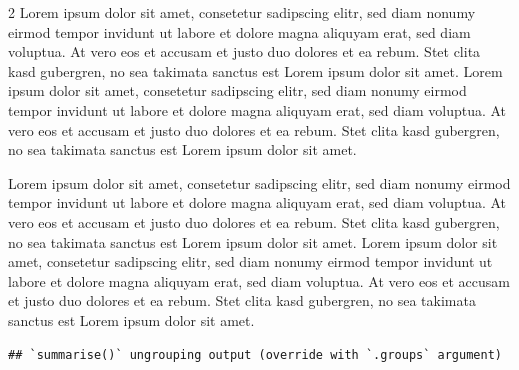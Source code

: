 \documentclass[
  twoside]{article}
\begin{document}
\begin {multicols}{2}
Lorem ipsum dolor sit amet, consetetur sadipscing elitr, sed diam nonumy
eirmod tempor invidunt ut labore et dolore magna aliquyam erat, sed diam
voluptua. At vero eos et accusam et justo duo dolores et ea rebum. Stet
clita kasd gubergren, no sea takimata sanctus est Lorem ipsum dolor sit
amet. Lorem ipsum dolor sit amet, consetetur sadipscing elitr, sed diam
nonumy eirmod tempor invidunt ut labore et dolore magna aliquyam erat,
sed diam voluptua. At vero eos et accusam et justo duo dolores et ea
rebum. Stet clita kasd gubergren, no sea takimata sanctus est Lorem
ipsum dolor sit amet.

\end {multicols}

Lorem ipsum dolor sit amet, consetetur sadipscing elitr, sed diam nonumy
eirmod tempor invidunt ut labore et dolore magna aliquyam erat, sed diam
voluptua. At vero eos et accusam et justo duo dolores et ea rebum. Stet
clita kasd gubergren, no sea takimata sanctus est Lorem ipsum dolor sit
amet. Lorem ipsum dolor sit amet, consetetur sadipscing elitr, sed diam
nonumy eirmod tempor invidunt ut labore et dolore magna aliquyam erat,
sed diam voluptua. At vero eos et accusam et justo duo dolores et ea
rebum. Stet clita kasd gubergren, no sea takimata sanctus est Lorem
ipsum dolor sit amet.

\begin{verbatim}
## `summarise()` ungrouping output (override with `.groups` argument)
\end{verbatim}

\begin{table}[H]
\centering
{}
\end{table}
\end{document}
